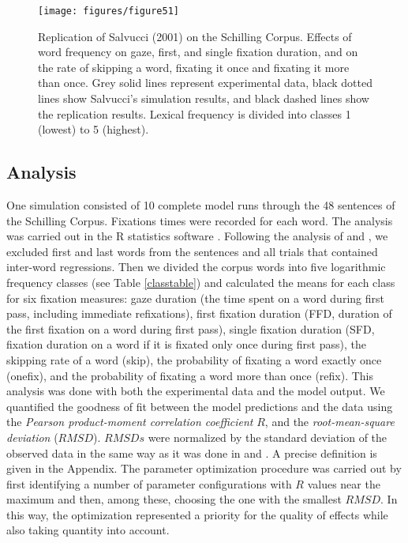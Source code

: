 \begin{figure}[!htbp]
\begin{center}
\texttt{[image: figures/figure51]}
\end{center}
\caption{Replication of Salvucci (2001) on the Schilling Corpus. Effects of word frequency on gaze, first, and single fixation duration, and on the rate of skipping a word, fixating it once and fixating it more than once.  Grey solid lines represent experimental data, black dotted lines show Salvucci's simulation results, and black dashed lines show the replication results.  Lexical frequency is divided into classes 1 (lowest) to 5 (highest).}
\label{fig:src-fstat}
\end{figure}

\subsection{Analysis}
One simulation consisted of 10 complete model runs through the 48 sentences of the Schilling Corpus.  Fixations times were recorded for each word.  The analysis was carried out in the R{} statistics software \cite{R2012}.  Following the analysis of \cite{Reichle1998} and \cite{Salvucci2001}, we excluded first and last words from the sentences and all trials that contained inter-word regressions. Then we divided the corpus words into five logarithmic frequency classes (see Table \ref{classtable}) and calculated the means for each class for six fixation measures: gaze duration (the time spent on a word during first pass, including immediate refixations), first fixation duration (FFD, duration of the first fixation on a word during first pass), single fixation duration (SFD, fixation duration on a word if it is fixated only once during first pass), the skipping rate of a word (skip), the probability of fixating a word exactly once (onefix), and the probability of fixating a word more than once (refix).  This analysis was done with both the experimental data and the model output.
We quantified the goodness of fit between the model predictions and the data using the  \emph{Pearson product-moment correlation coefficient} $R$, and the  \emph{root-mean-square deviation} ($RMSD$).  $RMSDs$ were normalized by the standard deviation of the observed data in the same way as it was done in \cite{Reichle1998} and \cite{Salvucci2001}.  A precise definition is given in the Appendix.
The parameter optimization procedure was carried out by first identifying a number of parameter configurations with $R$ values near the maximum and then, among these, choosing the one with the smallest $RMSD$.  In this way, the optimization represented a priority for the quality of effects while also taking quantity into account.

